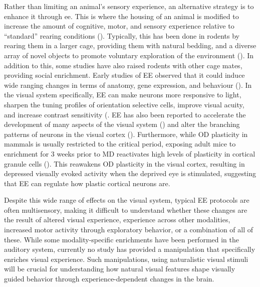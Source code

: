 Rather than limiting an animal's sensory experience, an alternative strategy is to enhance it through \gls{ee}. This is where the housing of an animal is modified to increase the amount of cognitive, motor, and sensory experience relative to “standard” rearing conditions (\cite{Nithianantharajah2006EnrichedSystem}). Typically, this has been done in rodents by rearing them in a larger cage, providing them with natural bedding, and a diverse array of novel objects to promote voluntary exploration of the environment (\cite{Alwis2014EnvironmentalInjury}). In addition to this, some studies have also raised rodents with other cage mates, providing social enrichment. Early studies of EE observed that it could induce wide ranging changes in terms of anatomy, gene expression, and behaviour (\cite{Hebb1947TheMaturity., Bennett1964ChemicalBrain, Diamond1976EffectsHippocampus}). In the visual system specifically, EE can make neurons more responsive to light, sharpen the tuning profiles of orientation selective cells, improve visual acuity, and increase contrast sensitivity (\cite{ Beaulieu1990EffectProperties, Beaulieu1990EffectCharacteristics, Mainardi2010EnvironmentalCortex}. EE has also been reported to accelerate the development of many aspects of the visual system (\cite{Cancedda2004AccelerationEnrichment}) and alter the branching patterns of neurons in the visual cortex (\cite{Greenough1973PatternEnvironments}). Furthermore, while OD plasticity in mammals is usually restricted to the critical period, exposing adult mice to enrichment for 3 weeks prior to MD reactivates high levels of plasticity in cortical granule cells (\cite{Baroncelli2010Experience-dependentCortex}). This reawakens OD plasticity in the visual cortex, resulting in depressed visually evoked activity when the deprived eye is stimulated, suggesting that EE can regulate how plastic cortical neurons are. 

Despite this wide range of effects on the visual system, typical EE protocols are often multisensory, making it difficult to understand whether these changes are the result of altered visual experience, experience across other modalities, increased motor activity through exploratory behavior, or a combination of all of these. While some modality-specific enrichments have been performed in the auditory system, currently no study has provided a manipulation that specifically enriches visual experience. Such manipulations, using naturalistic visual stimuli will be crucial for understanding how  natural visual features shape visually guided behavior through experience-dependent changes in the brain.

